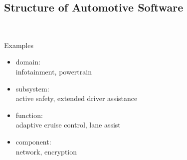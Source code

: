 \subsection{Structure of Automotive Software}
\begin{frame}{\insertsubsection\ \mytitlesource{\staron}}
	\begin{fancycolumns}[widths={65}]
		\nextcolumn
		\begin{example}{Examples}
			\begin{itemize}
				\item domain:\\infotainment, powertrain 
				\item subsystem:\\active safety, extended driver assistance
				\item function:\\adaptive cruise control, lane assist
				\item component:\\network, encryption
			\end{itemize}
		\end{example}
	\end{fancycolumns}
\end{frame}

